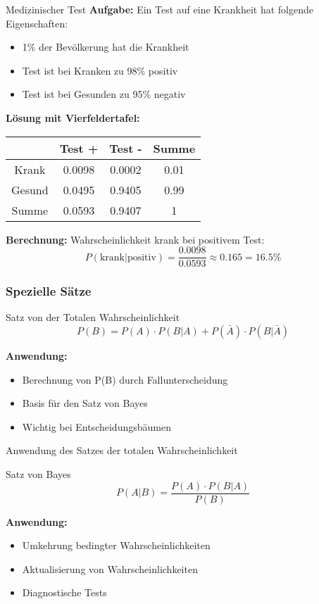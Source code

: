 \begin{example2}{Medizinischer Test}
\textbf{Aufgabe:} Ein Test auf eine Krankheit hat folgende Eigenschaften:
\begin{itemize}
\item 1\% der Bevölkerung hat die Krankheit
\item Test ist bei Kranken zu 98\% positiv
\item Test ist bei Gesunden zu 95\% negativ
\end{itemize}

\textbf{Lösung mit Vierfeldertafel:}
\begin{center}
\begin{tabular}{|c|c|c|c|}
\hline
 & Test + & Test - & Summe \\
\hline
Krank & 0.0098 & 0.0002 & 0.01 \\
\hline
Gesund & 0.0495 & 0.9405 & 0.99 \\
\hline
Summe & 0.0593 & 0.9407 & 1 \\
\hline
\end{tabular}
\end{center}

\textbf{Berechnung:} Wahrscheinlichkeit krank bei positivem Test:
$$P(\text{krank}|\text{positiv}) = \frac{0.0098}{0.0593} \approx 0.165 = 16.5\%$$
\end{example2}

\subsubsection{Spezielle Sätze}

\begin{theorem}{Satz von der Totalen Wahrscheinlichkeit}
$$P(B)=P(A) \cdot P(B|A)+P(\bar{A}) \cdot P(B|\bar{A})$$

\textbf{Anwendung:}
\begin{itemize}
    \item Berechnung von P(B) durch Fallunterscheidung
    \item Basis für den Satz von Bayes
    \item Wichtig bei Entscheidungsbäumen
\end{itemize}

\end{theorem}

\begin{KR}{Anwendung des Satzes der totalen Wahrscheinlichkeit}
\end{KR}

\begin{theorem}{Satz von Bayes}
$$P(A|B)=\frac{P(A) \cdot P(B|A)}{P(B)}$$

\textbf{Anwendung:}
\begin{itemize}
    \item Umkehrung bedingter Wahrscheinlichkeiten
    \item Aktualisierung von Wahrscheinlichkeiten
    \item Diagnostische Tests
\end{itemize}
\end{theorem}

